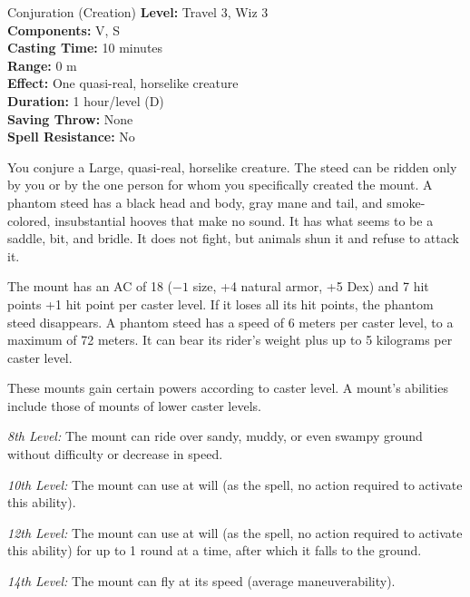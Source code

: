 {Conjuration (Creation)}
{
	\textbf{Level:}
	Travel 3, Wiz 3\\
	\textbf{Components:}
	V, S\\
	\textbf{Casting Time:}
	10 minutes\\
	\textbf{Range:}
	0 m\\
	\textbf{Effect:}
	One quasi-real, horselike creature\\
	\textbf{Duration:}
	1 hour/level (D)\\
	\textbf{Saving Throw:}
	None\\
	\textbf{Spell Resistance:}
	No\\
}
{
	You conjure a Large, quasi-real, horselike creature. The steed can be ridden only by you or by the one person for whom you specifically created the mount. A phantom steed has a black head and body, gray mane and tail, and smoke-colored, insubstantial hooves that make no sound. It has what seems to be a saddle, bit, and bridle. It does not fight, but animals shun it and refuse to attack it.

	The mount has an AC of 18 ($-1$ size, +4 natural armor, +5 Dex) and 7 hit points +1 hit point per caster level. If it loses all its hit points, the phantom steed disappears. A phantom steed has a speed of 6 meters per caster level, to a maximum of 72 meters. It can bear its rider's weight plus up to 5 kilograms per caster level.

	These mounts gain certain powers according to caster level. A mount's abilities include those of mounts of lower caster levels.

	\textit{8th Level:}
	The mount can ride over sandy, muddy, or even swampy ground without difficulty or decrease in speed.

	\textit{10th Level:}
	The mount can use  at will (as the spell, no action required to activate this ability).

	\textit{12th Level:}
	The mount can use  at will (as the spell, no action required to activate this ability) for up to 1 round at a time, after which it falls to the ground.

	\textit{14th Level:}
	The mount can fly at its speed (average maneuverability).

}
